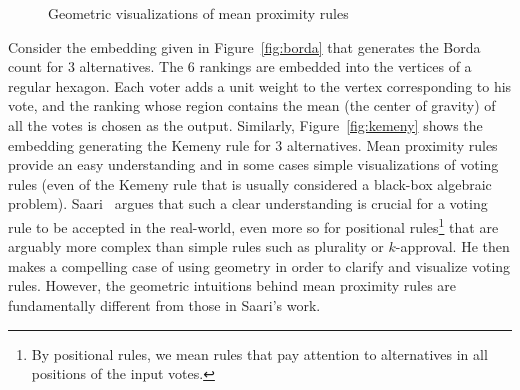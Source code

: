 \documentclass[prodmode]{acmsmall-ec14}
\begin{document}
{\footnotesize
\begin{figure}
\centering
{}\qquad
{}
\caption{Geometric visualizations of mean proximity rules}
\label{fig:geometric}
\end{figure}
}

Consider the embedding given in Figure~\ref{fig:borda} that generates the Borda count for $3$ alternatives. The $6$ rankings are embedded into the vertices of a regular hexagon. Each voter adds a unit weight to the vertex corresponding to his vote, and the ranking whose region contains the mean (the center of gravity) of all the votes is chosen as the output. %
Similarly, Figure~\ref{fig:kemeny} shows the embedding generating the Kemeny rule for $3$ alternatives. Mean proximity rules provide an easy understanding and in some cases simple visualizations of voting rules (even of the Kemeny rule that is usually considered a black-box algebraic problem). Saari~ argues that such a clear understanding is crucial for a voting rule to be accepted in the real-world, even more so for positional rules\footnote{By positional rules, we mean rules that pay attention to alternatives in all positions of the input votes.} that are arguably more complex than simple rules such as plurality or $k$-approval. He then makes a compelling case of using geometry in order to clarify and visualize voting rules. However, the geometric intuitions behind mean proximity rules are fundamentally different from those in Saari's work. 
\end{document}
